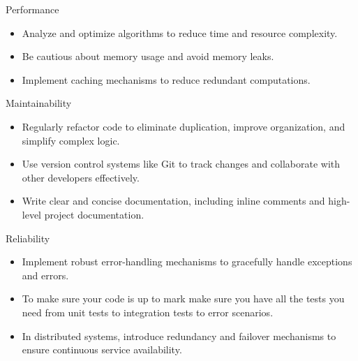 \documentclass[sectionframe]{oxblue-beamer}
\begin{document}
\begin{frame}{Performance}
\begin{itemize}
    \item Analyze and optimize algorithms to reduce time and resource complexity.
    \item Be cautious about memory usage and avoid memory leaks.
    \item Implement caching mechanisms to reduce redundant computations.
\end{itemize}
\end{frame}

\begin{frame}{Maintainability}
\begin{itemize}
    \item Regularly refactor code to eliminate duplication, improve organization, and simplify complex logic.
    \item Use version control systems like Git to track changes and collaborate with other developers effectively.
    \item Write clear and concise documentation, including inline comments and high-level project documentation.
\end{itemize}
\end{frame}

\begin{frame}{Reliability}
\begin{itemize}
    \item Implement robust error-handling mechanisms to gracefully handle exceptions and errors.
    \item To make sure your code is up to mark make sure you have all the tests you need from unit tests to integration tests to error scenarios.
    \item In distributed systems, introduce redundancy and failover mechanisms to ensure continuous service availability.
\end{itemize}
\end{frame}
\end{document}
